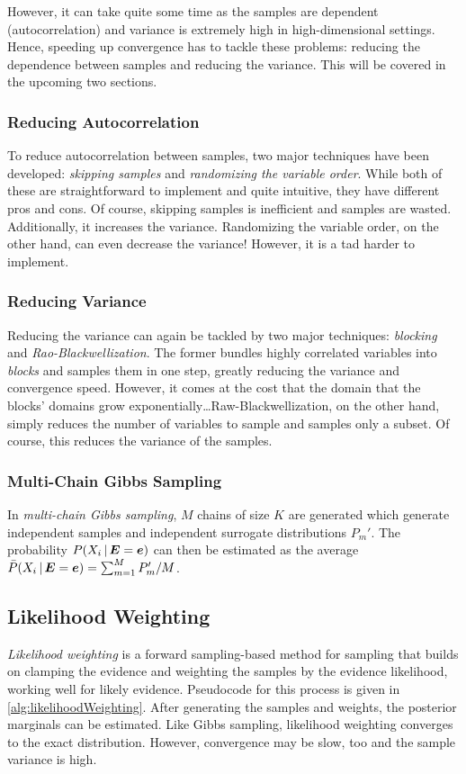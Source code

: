 				However, it can take quite some time as the samples are dependent (autocorrelation) and variance is extremely high in high-dimensional settings. Hence, speeding up convergence has to tackle these problems: reducing the dependence between samples and reducing the variance. This will be covered in the upcoming two sections.

			\subsubsection{Reducing Autocorrelation}
				To reduce autocorrelation between samples, two major techniques have been developed: \emph{skipping samples} and \emph{randomizing the variable order}. While both of these are straightforward to implement and quite intuitive, they have different pros and cons. Of course, skipping samples is inefficient and samples are wasted. Additionally, it increases the variance. Randomizing the variable order, on the other hand, can even decrease the variance! However, it is a tad harder to implement.

			\subsubsection{Reducing Variance}
				Reducing the variance can again be tackled by two major techniques: \emph{blocking} and \emph{Rao-Blackwellization}. The former bundles highly correlated variables into \emph{blocks} and samples them in one step, greatly reducing the variance and convergence speed. However, it comes at the cost that the domain that the blocks' domains grow exponentially\dots Raw-Blackwellization, on the other hand, simply reduces the number of variables to sample and samples only a subset. Of course, this reduces the variance of the samples.

			\subsubsection{Multi-Chain Gibbs Sampling}
				In \emph{multi-chain Gibbs sampling}, \(M\) chains of size \(K\) are generated which generate independent samples and independent surrogate distributions \( P_m' \). The probability \( P(X_i \,\vert\, \bm{E} = \bm{e}) \) can then be estimated as the average \( \bar{P}(X_i \,\vert\, \bm{E} = \bm{e}) = \sum_{m = 1}^{M} P_m' / M \).

		\subsection{Likelihood Weighting}
			\emph{Likelihood weighting} is a forward sampling-based method for sampling that builds on clamping the evidence and weighting the samples by the evidence likelihood, working well for likely evidence. Pseudocode for this process is given in \autoref{alg:likelihoodWeighting}. After generating the samples and weights, the posterior marginals can be estimated. Like Gibbs sampling, likelihood weighting converges to the exact distribution. However, convergence may be slow, too and the sample variance is high.

